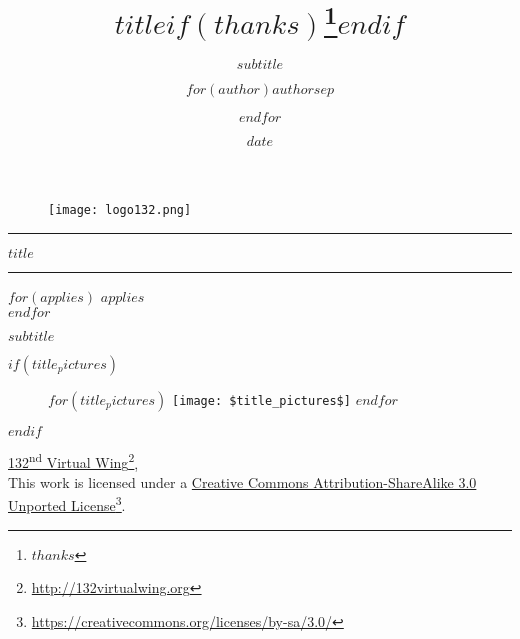 \documentclass[$if(fontsize)$$fontsize$,$endif$$if(lang)$$babel-lang$,$endif$$if(papersize)$$papersize$paper,$endif$$for(classoption)$$classoption$$sep$,$endfor$]{$documentclass$}
\title{$title$$if(thanks)$\thanks{$thanks$}$endif$}
\subtitle{$subtitle$}
\author{$for(author)$$author$$sep$ \and $endfor$}
\institute{$for(institute)$$institute$$sep$ \and $endfor$}
\date{$date$}
\renewcommand{\href}[2]{#2\footnote{\url{#1}}}
\newcommand{\wing}{132\textsuperscript{nd} Virtual Wing}
\begin{document}
\thispagestyle{empty}

\begin{center}
    \vspace*{\fill}

    \begin{figure}[h]
      \centering
      \texttt{[image: logo132.png]}
    \end{figure}

    \vspace{2cm}

    \noindent\rule{\textwidth}{0.4pt}
    \vspace{0.1cm}

    {\fontsize{2cm}{2.3cm}\selectfont $title$}

    \noindent\rule{\textwidth}{0.4pt}

    $for(applies)$
        $applies$ \\
    $endfor$

    $subtitle$

    $if(title_pictures)$
        \vspace{1cm}
        \begin{figure}[h]
            \begin{minipage}[c]{\linewidth}
                \centering
                $for(title_pictures)$
                      \texttt{[image: \$title\_pictures\$]}
                $endfor$
            \end{minipage}
        \end{figure}
    $endif$

    \vspace{2cm}

    \underline{\href{http://132virtualwing.org}{\wing}}, \the\year \\
    \vspace{0.3cm}
    This work is licensed under a \underline{\href{https://creativecommons.org/licenses/by-sa/3.0/}{Creative Commons Attribution-ShareAlike 3.0 Unported License}}.

    \vfill
\end{center}
\restoregeometry
\newpage
\thispagestyle{empty}
\end{document}
